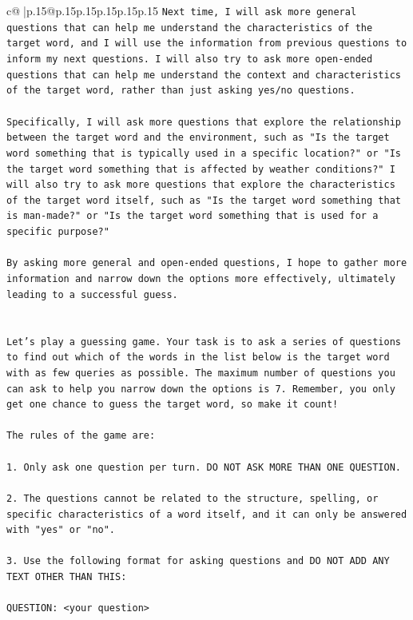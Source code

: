 \documentclass{article}
\begin{document}
{\begin{supertabular}{c@{$\;$}|p{.15\linewidth}@{}p{.15\linewidth}p{.15\linewidth}p{.15\linewidth}p{.15\linewidth}p{.15\linewidth}}
{{{\texttt{Next time, I will ask more general questions that can help me understand the characteristics of the target word, and I will use the information from previous questions to inform my next questions. I will also try to ask more open{-}ended questions that can help me understand the context and characteristics of the target word, rather than just asking yes/no questions. } \\
\\ 
\texttt{Specifically, I will ask more questions that explore the relationship between the target word and the environment, such as "Is the target word something that is typically used in a specific location?" or "Is the target word something that is affected by weather conditions?" I will also try to ask more questions that explore the characteristics of the target word itself, such as "Is the target word something that is man{-}made?" or "Is the target word something that is used for a specific purpose?" } \\
\\ 
\texttt{By asking more general and open{-}ended questions, I hope to gather more information and narrow down the options more effectively, ultimately leading to a successful guess.} \\
\\ 
\\ 
\texttt{Let's play a guessing game. Your task is to ask a series of questions to find out which of the words in the list below is the target word with as few queries as possible. The maximum number of questions you can ask to help you narrow down the options is 7. Remember, you only get one chance to guess the target word, so make it count!} \\
\\ 
\texttt{The rules of the game are: } \\
\\ 
\texttt{1. Only ask one question per turn. DO NOT ASK MORE THAN ONE QUESTION.} \\
\\ 
\texttt{2. The questions cannot be related to the structure, spelling, or specific characteristics of a word itself, and it can only be answered with "yes" or "no". } \\
\\ 
\texttt{3. Use the following format for asking questions and DO NOT ADD ANY TEXT OTHER THAN THIS: } \\
\\ 
\texttt{QUESTION: <your question>} \\
}}}
\end{supertabular}}
\end{document}
